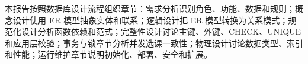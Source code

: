 本报告按照数据库设计流程组织章节：需求分析识别角色、功能、数据和规则；概念设计使用 ER 模型抽象实体和联系；逻辑设计把 ER 模型转换为关系模式；规范化设计分析函数依赖和范式；完整性设计讨论主键、外键、CHECK、UNIQUE 和应用层校验；事务与锁章节分析并发选课一致性；物理设计讨论数据类型、索引和性能；运行维护章节说明初始化、部署、安全和扩展。




